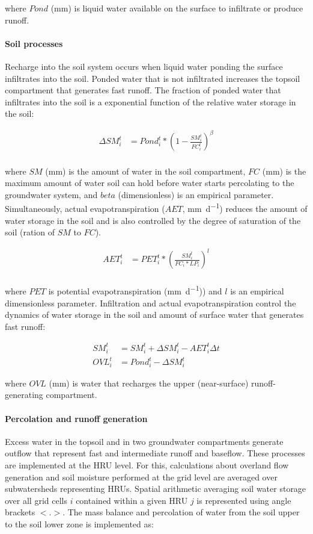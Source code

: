 \noindent where $Pond$ (\si{\milli\metre}) is liquid water available on the surface to infiltrate or produce runoff.

\paragraph{Soil processes} 
Recharge into the soil system occurs when liquid water ponding the surface infiltrates into the soil. Ponded water that is not infiltrated increases the topsoil compartment that generates fast runoff. The fraction of ponded water that infiltrates into the soil is a exponential function of the relative water storage in the soil:

\begin{align}
\Delta SM_i^t &= Pond_i^t * \left(1 - \frac{SM_i^t}{FC_i^t} \right)^\beta \\
\end{align}

\noindent where $SM$ (\si{\milli\metre}) is the amount of water in the soil compartment, $FC$ (\si{\milli\metre}) is the maximum amount of water soil can hold before water starts percolating to the groundwater system, and $beta$ (dimensionless) is an empirical parameter. Simultaneously, actual evapotranspiration ($AET$, \si{\milli\metre\per\day}) reduces the amount of water storage in the soil and is also controlled by the degree of saturation of the soil (ration of $SM$ to $FC$).

\begin{align}
AET_i^t &= PET_i^t * \left(\frac{SM_i^t}{FC_i * LP_i} \right)^l  \\
\end{align}

\noindent where $PET$ is potential evapotranspiration (\si{\milli\metre\per\day})) and $l$ is an empirical dimensionless parameter. Infiltration and actual evapotranspiration control the dynamics of water storage in the soil and amount of surface water that generates fast runoff:

\begin{align}
SM_i^t &= SM_i^{t} + \Delta SM_i^t - AET_i^t \Delta t\\
OVL_i^t &= Pond_i^t - \Delta SM_i^t
\end{align}

\noindent where $OVL$ (\si{\milli\metre}) is water that recharges the upper (near-surface) runoff-generating compartment.

\paragraph{Percolation and runoff generation}
Excess water in the topsoil and in two groundwater compartments generate outflow that represent fast and intermediate runoff and baseflow. These processes are implemented at the HRU level. For this, calculations about overland flow generation and soil moisture performed at the grid level are averaged over subwatersheds representing HRUs. Spatial arithmetic averaging soil water storage over all grid cells $i$ contained within a given HRU $j$ is represented using angle brackets $<.>$. The mass balance and percolation of water from the soil upper to the soil lower zone is implemented as:

